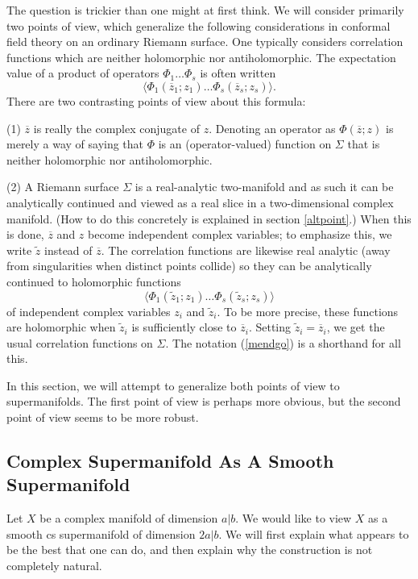 \documentclass[11pt,a4paper]{article}
\def\t{{ \sf t}}
\def\tilde{\widetilde}
\def\t{\tilde }
\def\tilde{\widetilde}
\def\bar{\overline}
\begin{document}
The question is trickier than one might at first think.  We will consider primarily two points of view, which generalize the following
considerations in conformal field theory on an ordinary Riemann surface.  One typically considers correlation functions which are neither holomorphic nor
antiholomorphic.  The expectation value of a product of operators $\Phi_1\dots\Phi_s$ is often written
\begin{equation}\label{mendgo} \langle\Phi_1(\bar z_1;z_1)\dots \Phi_s(\bar z_s;z_s)\rangle.\end{equation}
There are two contrasting points of view about this formula: 

(1) $\bar z$ is really the complex conjugate of $z$.  Denoting an operator as $\Phi(\bar z;z)$ is merely a way of saying that $\Phi$ is an (operator-valued)
function on $\Sigma$ that is neither holomorphic nor antiholomorphic.  

(2) A Riemann surface $\Sigma$ is a real-analytic two-manifold and as such it can be analytically continued and viewed as a real
slice in a two-dimensional complex manifold. (How to do this concretely is explained in section \ref{altpoint}.)   When this is done, $\bar z$ and $z$ become independent complex variables; to emphasize
this, we write $\t z$ instead of $\bar z$.  The correlation functions are likewise real analytic (away from singularities when distinct points collide)
so they can be analytically continued to holomorphic functions 
\begin{equation}\label{mendgox} \langle\Phi_1(\t z_1;z_1)\dots \Phi_s(\t z_s;z_s)\rangle\end{equation}
 of independent complex variables $z_i$ and $\t z_i$. To be more precise, these functions are holomorphic when $\t z_i$ is sufficiently close to $\bar z_i$.
 Setting $\t z_i=\bar z_i$, we get the usual correlation functions on $\Sigma$.  The notation (\ref{mendgo}) is a shorthand for all this.
 
In this section, we will attempt to generalize both points of view to supermanifolds.  The first point of view is perhaps more obvious, but the second
point of view seems to be more robust.  

\subsection{Complex Supermanifold As A Smooth Supermanifold}\label{bsc}

Let $X$ be a complex manifold of dimension $a|b$.  We would like to view $X$ as a smooth cs supermanifold of dimension $2a|b$.
We will first explain what appears to be the best that one can do, and then explain why the construction is not completely natural.   
\end{document}
